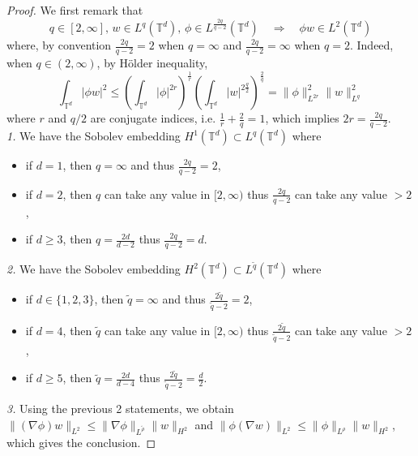 \documentclass[a4paper]{article}
\theoremstyle{plain}
\newcommand{\T}{\mathbb{T}}
\begin{document}
\begin{proof}
We first remark that 
\begin{equation} \label{step0}
q \in [2,\infty],\, w \in L^q(\T^d),\, \phi \in L^{\frac{2q}{q-2}}(\T^d)
\quad \Rightarrow \quad
\phi w \in L^2(\T^d)
\end{equation}
where, by convention $\frac{2q}{q-2}=2$ when $q=\infty$ and 
$\frac{2q}{q-2}=\infty$ when $q=2$. Indeed, when $q \in (2,\infty)$, by Hölder inequality,
$$\int_{\T^d} |\phi w|^2 \leq 
\left( \int_{\T^d} |\phi|^{2r} \right)^{\frac{1}{r}}
\left( \int_{\T^d} |w|^{2 \frac{q}{2}} \right)^{\frac{2}{q}}
= \|\phi\|_{L^{2r}}^2 \|w\|_{L^q}^2$$
where $r$ and $q/2$ are conjugate indices, i.e. $\frac{1}{r}+\frac{2}{q}=1$,
which implies $2r=\frac{2q}{q-2}$.
\\
\noindent \emph{1.} We have the Sobolev embedding $H^1(\T^d) \subset L^q(\T^d)$ where
\begin{itemize}[topsep=0cm, parsep=0cm, itemsep=0cm]
    \item if $d=1$, then $q=\infty$ and thus $\frac{2q}{q-2}=2$,
    \item if $d=2$, then $q$ can take any value in $[2,\infty)$ thus $\frac{2q}{q-2}$ can take any value $>2$, 
    \item if $d\geq 3$, then $q=\frac{2d}{d-2}$ thus $\frac{2q}{q-2}=d$.
\end{itemize}

\noindent \emph{2.} We have the Sobolev embedding $H^2(\T^d) \subset L^{\widetilde{q}}(\T^d)$ where
\begin{itemize}[topsep=0cm, parsep=0cm, itemsep=0cm]
    \item if $d \in \{1,2,3\}$, then $\widetilde{q}=\infty$ and thus $\frac{2\widetilde{q}}{\widetilde{q}-2}=2$,
    \item if $d=4$, then $\widetilde{q}$ can take any value in $[2,\infty)$ thus $\frac{2\widetilde{q}}{\widetilde{q}-2}$ can take any value $>2$, 
    \item if $d\geq 5$, then $\widetilde{q}=\frac{2d}{d-4}$ thus $\frac{2\widetilde{q}}{\widetilde{q}-2}=\frac{d}{2}$.
\end{itemize}

\noindent \emph{3.} Using the previous 2 statements, we obtain
$\| (\nabla \phi) w \|_{L^2} \leq \| \nabla \phi \|_{L^{\widetilde{\rho}}} \|w\|_{H^2}$ and
$\| \phi (\nabla w) \|_{L^2} \leq \| \phi \|_{L^{\rho}} \|w\|_{H^2}$, which gives the conclusion.
\end{proof}
\end{document}
